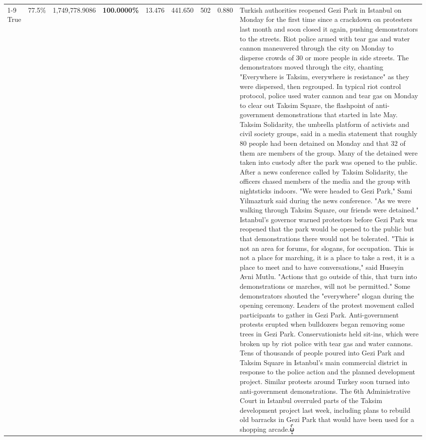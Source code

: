 \begin{table}[H]
\begin{tabular}{lllrlllll}
\cline{1-9}
True & 77.5\% & 1,749,778.9086 & \bfseries \color{red} 100.0000\% & 13.476 & 441.650 & 502 & 0.880 & Turkish authorities reopened Gezi Park in Istanbul on Monday for the first time since a crackdown on protesters last month and soon closed it again, pushing demonstrators to the streets. Riot police armed with tear gas and water cannon maneuvered through the city on Monday to disperse crowds of 30 or more people in side streets. The demonstrators moved through the city, chanting "Everywhere is Taksim, everywhere is resistance" as they were dispersed, then regrouped. In typical riot control protocol, police used water cannon and tear gas on Monday to clear out Taksim Square, the flashpoint of anti-government demonstrations that started in late May. Taksim Solidarity, the umbrella platform of activists and civil society groups, said in a media statement that roughly 80 people had been detained on Monday and that 32 of them are members of the group. Many of the detained were taken into custody after the park was opened to the public. After a news conference called by Taksim Solidarity, the officers chased members of the media and the group with nightsticks indoors. "We were headed to Gezi Park," Sami Yilmazturk said during the news conference. "As we were walking through Taksim Square, our friends were detained." Istanbul's governor warned protestors before Gezi Park was reopened that the park would be opened to the public but that demonstrations there would not be tolerated. "This is not an area for forums, for slogans, for occupation. This is not a place for marching, it is a place to take a rest, it is a place to meet and to have conversations," said Huseyin Avni Mutlu. "Actions that go outside of this, that turn into demonstrations or marches, will not be permitted." Some demonstrators shouted the "everywhere" slogan during the opening ceremony. Leaders of the protest movement called participants to gather in Gezi Park. Anti-government protests erupted when bulldozers began removing some trees in Gezi Park. Conservationists held sit-ins, which were broken up by riot police with tear gas and water cannons. Tens of thousands of people poured into Gezi Park and Taksim Square in Istanbul's main commercial district in response to the police action and the planned development project. Similar protests around Turkey soon turned into anti-government demonstrations. The 6th Administrative Court in Istanbul overruled parts of the Taksim development project last week, including plans to rebuild old barracks in Gezi Park that would have been used for a shopping arcade.မ့် \\

\end{tabular}
\end{table}
